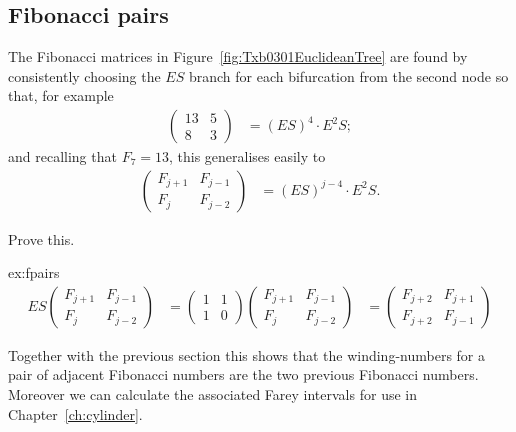 \subsection{Fibonacci pairs}
\label{sec:euclidean}
The Fibonacci matrices in Figure~\ref{fig:Txb0301EuclideanTree} are found by consistently choosing the $ES$ branch for each bifurcation from the second node so that, for example
\begin{align*}
	\begin{pmatrix} 
	13 & 5 
		\\
		8 & 3
	\end{pmatrix} &= 	(E S)^{{4}} \cdot E^2 S ;
\end{align*}
and recalling that $F_{7}=13$, this generalises easily to
\begin{align}
	\begin{pmatrix} 
		F_{j+1} & F_{j-1} 
		\\
		F _j & F_{j-2}
	\end{pmatrix} &= 	(E S)^{{j-4}} \cdot E^2 S.
\label{eq:FibonacciMatrix}
\end{align}
%
\begin{jExercise}\label{ex:fpairs}
	Prove this.
\end{jExercise}
%
\begin{jAnswer}{ex:fpairs}{
\begin{align}
E S \begin{pmatrix} 	F_{j+1} & F_{j-1} 	\\	F _j & F_{j-2}\end{pmatrix}
  &= 	\begin{pmatrix} 1 & 1\\1 & 0 \end{pmatrix}
\begin{pmatrix} F_{j+1} & F_{j-1} \\F _j & F_{j-2}\end{pmatrix}
&= 
\begin{pmatrix} 	F_{j+2} & F_{j+1} 	\\	F _{j+2} & F_{j-1}
\end{pmatrix}
\end{align}
}\end{jAnswer}
%
Together with the previous section this shows that the winding-numbers for a pair of adjacent Fibonacci numbers are the two previous Fibonacci numbers.
Moreover we can calculate the associated Farey intervals for use in Chapter~\ref{ch:cylinder}.


